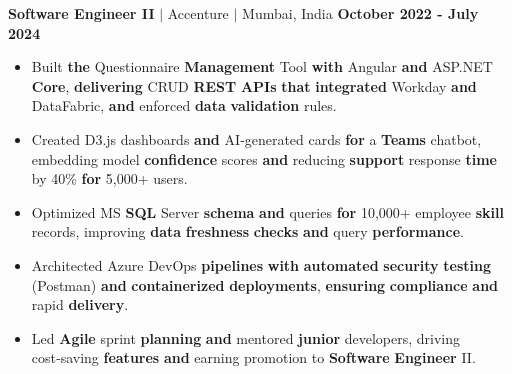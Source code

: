 \documentclass[letterpaper,10pt]{article}
\begin{document}
{\textbf{Software Engineer II} $|$ Accenture $|$ Mumbai, India \hfill \textbf{October 2022 - July 2024}
\begin{itemize}
    \item Built \textbf{the} Questionnaire \textbf{Management} Tool \textbf{with} Angular \textbf{and} ASP.NET \textbf{Core}, \textbf{delivering} CRUD \textbf{REST} \textbf{APIs} \textbf{that} \textbf{integrated} Workday \textbf{and} DataFabric, \textbf{and} enforced \textbf{data} \textbf{validation} rules.
    \item Created D3.js dashboards \textbf{and} AI‑generated cards \textbf{for} a \textbf{Teams} chatbot, embedding model \textbf{confidence} scores \textbf{and} reducing \textbf{support} response \textbf{time} by 40\% \textbf{for} 5,000+ users.
    \item Optimized MS \textbf{SQL} Server \textbf{schema} \textbf{and} queries \textbf{for} 10,000+ employee \textbf{skill} records, improving \textbf{data} \textbf{freshness} \textbf{checks} \textbf{and} query \textbf{performance}.
    \item Architected Azure DevOps \textbf{pipelines} \textbf{with} \textbf{automated} \textbf{security} \textbf{testing} (Postman) \textbf{and} \textbf{containerized} \textbf{deployments}, \textbf{ensuring} \textbf{compliance} \textbf{and} rapid \textbf{delivery}.
    \item Led \textbf{Agile} sprint \textbf{planning} \textbf{and} mentored \textbf{junior} developers, driving cost‑saving \textbf{features} \textbf{and} earning promotion to \textbf{Software} \textbf{Engineer} II.
\end{itemize}}
\end{document}
